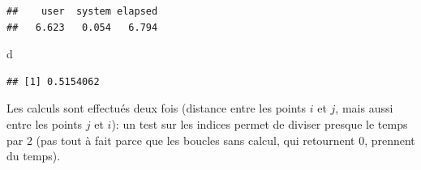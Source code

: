 \documentclass[
  12pt,
  french,
  a4paper,
  extrafontsizes,onecolumn,openright
  ]{memoir}
\newenvironment{Shaded}{\begin{snugshade}}{\end{snugshade}}
\newcommand{\ControlFlowTok}[1]{\textcolor[rgb]{0.13,0.29,0.53}{\textbf{#1}}}
\newcommand{\DecValTok}[1]{\textcolor[rgb]{0.00,0.00,0.81}{#1}}
\newcommand{\KeywordTok}[1]{\textcolor[rgb]{0.13,0.29,0.53}{\textbf{#1}}}
\newcommand{\NormalTok}[1]{#1}
\newcommand{\OperatorTok}[1]{\textcolor[rgb]{0.81,0.36,0.00}{\textbf{#1}}}
\newcommand{\StringTok}[1]{\textcolor[rgb]{0.31,0.60,0.02}{#1}}
\begin{document}
\begin{verbatim}
##    user  system elapsed 
##   6.623   0.054   6.794
\end{verbatim}

\begin{Shaded}
\begin{Highlighting}[]
\NormalTok{d}
\end{Highlighting}
\end{Shaded}

\begin{verbatim}
## [1] 0.5154062
\end{verbatim}

\normalsize

Les calculs sont effectués deux fois (distance entre les points \(i\) et \(j\), mais aussi entre les points \(j\) et \(i\)): un test sur les indices permet de diviser presque le temps par 2 (pas tout à fait parce que les boucles sans calcul, qui retournent \(0\), prennent du temps).

\scriptsize

\begin{Shaded}
\end{Shaded}
\end{document}
